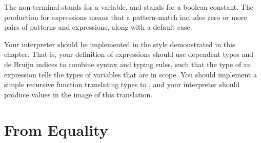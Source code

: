 \documentclass[12pt]{report}
\begin{document}
\begin{enumerate}
\coqdocemptyline


  The non-terminal  stands for a variable, and  stands for a boolean constant.  The production for  expressions means that a pattern-match includes zero or more pairs of patterns and expressions, along with a default case.


  Your interpreter should be implemented in the style demonstrated in this chapter.  That is, your definition of expressions should use dependent types and de Bruijn indices to combine syntax and typing rules, such that the type of an expression tells the types of variables that are in scope.  You should implement a simple recursive function translating types  to , and your interpreter should produce values in the image of this translation.


\end{enumerate} 

\section{From Equality}
\end{document}

